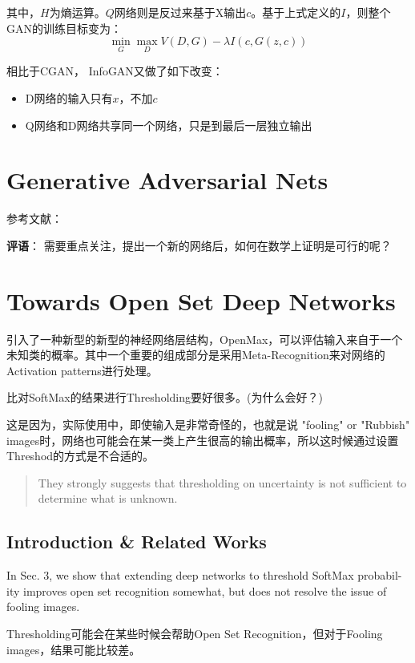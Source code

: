 其中，$H$为熵运算。$Q$网络则是反过来基于X输出$c$。基于上式定义的$I$，则整个GAN的训练目标变为：
\begin{displaymath}
\min_G \max_D V(D, G) - \lambda I(c, G(z, c))
\end{displaymath}

相比于CGAN， InfoGAN又做了如下改变：
\begin{itemize}
\item D网络的输入只有$x$，不加$c$
\item Q网络和D网络共享同一个网络，只是到最后一层独立输出
\end{itemize}

\section{Generative Adversarial Nets}

参考文献：\cite{Goodfellow2014GAN}

{\color{red} \textbf{评语}： 需要重点关注，提出一个新的网络后，如何在数学上证明是可行的呢？}


\section{Towards Open Set Deep Networks}

引入了一种新型的新型的神经网络层结构，OpenMax，可以评估输入来自于一个未知类的概率。其中一个重要的组成部分是采用Meta-Recognition来对网络的Activation patterns进行处理。

比对SoftMax的结果进行Thresholding要好很多。(为什么会好？)

这是因为，实际使用中，即使输入是非常奇怪的，也就是说 "fooling" or "Rubbish" images时，网络也可能会在某一类上产生很高的输出概率，所以这时候通过设置Threshod的方式是不合适的。
\begin{quote}
They strongly
suggests that thresholding on uncertainty is not sufficient
to determine what is unknown.
\end{quote}

\subsection{Introduction \& Related Works}

In Sec. 3, we show that
extending deep networks to threshold SoftMax probabil-
ity improves open set recognition somewhat, but does not
resolve the issue of fooling images.

Thresholding可能会在某些时候会帮助Open Set Recognition，但对于Fooling images，结果可能比较差。



















